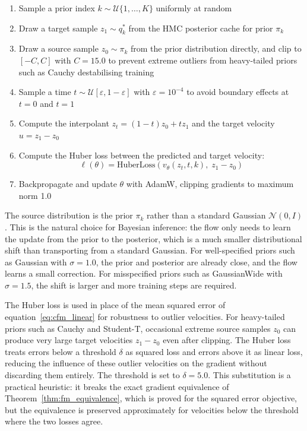 \begin{enumerate}[noitemsep]
    \item Sample a prior index 
    $k \sim \mathcal{U}\{1, \ldots, K\}$ 
    uniformly at random
    \item Draw a target sample 
    $z_1 \sim q^*_k$ from the HMC 
    posterior cache for prior $\pi_k$
    \item Draw a source sample 
    $z_0 \sim \pi_k$ from the prior 
    distribution directly, and clip 
    to $[-C, C]$ with $C = 15.0$ to 
    prevent extreme outliers from 
    heavy-tailed priors such as 
    Cauchy destabilising training
    \item Sample a time 
    $t \sim \mathcal{U}[\varepsilon, 
    1-\varepsilon]$ with 
    $\varepsilon = 10^{-4}$ to avoid 
    boundary effects at $t = 0$ 
    and $t = 1$
    \item Compute the interpolant 
    $z_t = (1-t)z_0 + tz_1$ and the 
    target velocity $u = z_1 - z_0$
    \item Compute the Huber loss 
    between the predicted and target 
    velocity:
    \begin{equation}
        \ell(\theta) = 
        \mathrm{HuberLoss}
        (v_\theta(z_t, t, k),\; 
        z_1 - z_0)
        \label{eq:huber_loss}
    \end{equation}
    \item Backpropagate and update 
    $\theta$ with AdamW, clipping 
    gradients to maximum norm 1.0
\end{enumerate}

The source distribution is the prior 
$\pi_k$ rather than a standard Gaussian 
$\mathcal{N}(0, I)$. This is the 
natural choice for Bayesian inference: 
the flow only needs to learn the update 
from the prior to the posterior, which 
is a much smaller distributional shift 
than transporting from a standard 
Gaussian. For well-specified priors 
such as Gaussian with $\sigma = 1.0$, 
the prior and posterior are already 
close, and the flow learns a small 
correction. For misspecified priors 
such as GaussianWide with $\sigma = 1.5$, 
the shift is larger and more training 
steps are required.

The Huber loss is used in place of the 
mean squared error of 
equation~\eqref{eq:cfm_linear} for 
robustness to outlier velocities. For 
heavy-tailed priors such as Cauchy and 
Student-T, occasional extreme source 
samples $z_0$ can produce very large 
target velocities $z_1 - z_0$ even 
after clipping. The Huber loss treats 
errors below a threshold $\delta$ as 
squared loss and errors above it as 
linear loss, reducing the influence of 
these outlier velocities on the gradient 
without discarding them entirely. The 
threshold is set to $\delta = 5.0$. 
This substitution is a practical 
heuristic: it breaks the exact gradient 
equivalence of 
Theorem~\ref{thm:fm_equivalence}, which 
is proved for the squared error 
objective, but the equivalence is 
preserved approximately for velocities 
below the threshold where the two 
losses agree.
